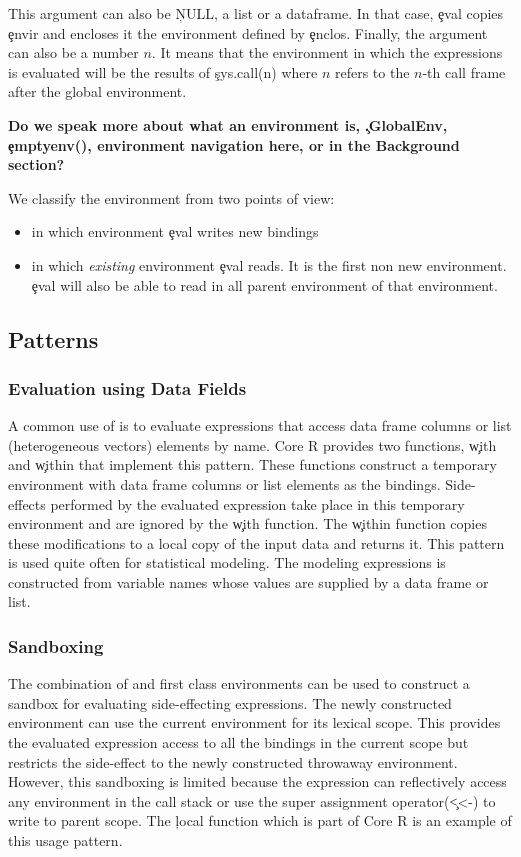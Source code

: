 \documentclass[conference]{IEEEtran}
\begin{document}
 This argument can also be \c{NULL}, a list or a dataframe. In that case, \c{eval} copies \c{envir} and encloses it the environment defined by \c{enclos}. Finally, the argument can also be a number $n$. It means that the environment in which the expressions is evaluated will be the results of \c{sys.call(n)} where $n$ refers to the $n$-th call frame after the global environment.

\textbf{Do we speak more about what an environment is, \c{.GlobalEnv}, \c{emptyenv()}, environment navigation here, or in the Background section?}

We classify the environment from two points of view:
\begin{itemize}
	\item in which environment \c{eval} writes new bindings 
	\item in which \emph{existing} environment \c{eval} reads. It is the first non new environment. \c{eval} will also be able to read in all parent environment of that environment. 
\end{itemize}


\subsection{Patterns}

  \subsubsection{Evaluation using Data Fields} A common use of \eval is to
  evaluate expressions that access data frame columns or list (heterogeneous
  vectors) elements by name. Core R provides two functions, \c{with} and
  \c{within} that implement this pattern. These functions construct a temporary
  environment with data frame columns or list elements as the bindings.
  Side-effects performed by the evaluated expression take place in this temporary
  environment and are ignored by the \c{with} function. The \c{within} function
  copies these modifications to a local copy of the input data and returns it.
  This pattern is used quite often for statistical modeling. The modeling
  expressions is constructed from variable names whose values are supplied by a
  data frame or list.

  \subsubsection{Sandboxing} The combination of \eval and first class
  environments can be used to construct a sandbox for evaluating side-effecting
  expressions. The newly constructed environment can use the current environment
  for its lexical scope. This provides the evaluated expression access to all the
  bindings in the current scope but restricts the side-effect to the newly
  constructed throwaway environment. However, this sandboxing is limited because
  the expression can reflectively access any environment in the call stack or use
  the super assignment operator(\c{<<-}) to write to parent scope. The \c{local}
  function which is part of Core R is an example of this usage pattern.
\end{document}
